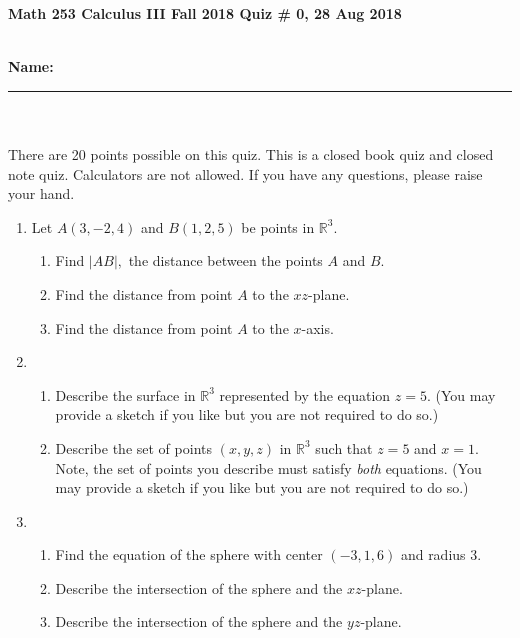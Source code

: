 \documentclass[11pt]{article}
\theoremstyle{remark}
\begin{document}
{\bf Math 253 Calculus III Fall 2018 \hfill Quiz \# 0,  28 Aug 2018 }\\
\\
{\bf Name: \rule{3.5in}{1pt}}\\
\\
\noindent There are 20 points possible on this quiz. This is a closed
book quiz and closed note quiz. Calculators are not allowed. If you have any questions, please
raise your hand.

\begin{enumerate}
\item Let $A(3,-2,4)$ and $B(1,2,5)$ be points in $\mathbb{R}^3.$
\begin{enumerate}
\item Find $|AB|,$ the distance between the points $A$ and $B.$
\vspace{0.75in}
\item Find the distance from point $A$ to the $xz$-plane.
\vspace{0.75in}
\item Find the distance from point $A$ to the $x$-axis.
\vspace{0.75in}
\end{enumerate}
\item 
\begin{enumerate}
\item Describe the surface in $\mathbb{R}^3$ represented by the equation $z=5.$ (You may provide a sketch if you like but you are not required to do so.)
\vfill
\item Describe the set of points $(x,y,z)$ in $\mathbb{R}^3$ such that $z=5$ and $x=1.$ Note, the set of points you describe must satisfy \emph{both} equations. (You may provide a sketch if you like but you are not required to do so.)
\vfill
\end{enumerate}
\newpage
\item 
\begin{enumerate}
\item Find the equation of the sphere with center $(-3,1,6)$ and radius 3.
\vfill
\item Describe the intersection of the sphere and the $xz$-plane.
\vfill
\item Describe the intersection of the sphere and the $yz$-plane.
\vfill

\end{enumerate}
\end{enumerate}
\end{document}
